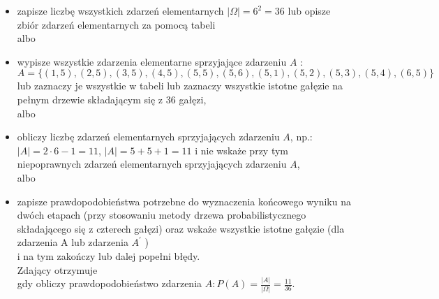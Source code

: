 \documentclass[10pt]{article}
\begin{document}
\begin{itemize}
  \item zapisze liczbę wszystkich zdarzeń elementarnych $|\Omega|=6^{2}=36$ lub opisze zbiór zdarzeń elementarnych za pomocą tabeli\\
albo
  \item wypisze wszystkie zdarzenia elementarne sprzyjające zdarzeniu $A$ :\\
$A=\{(1,5),(2,5),(3,5),(4,5),(5,5),(5,6),(5,1),(5,2),(5,3),(5,4),(6,5)\}$\\
lub zaznaczy je wszystkie w tabeli lub zaznaczy wszystkie istotne gałęzie na pełnym drzewie składającym się z 36 gałęzi,\\
albo
  \item obliczy liczbę zdarzeń elementarnych sprzyjających zdarzeniu $A$, np.: $|A|=2 \cdot 6-1=11$, $|A|=5+5+1=11$ i nie wskaże przy tym niepoprawnych zdarzeń elementarnych sprzyjających zdarzeniu $A$,\\
albo
  \item zapisze prawdopodobieństwa potrzebne do wyznaczenia końcowego wyniku na dwóch etapach (przy stosowaniu metody drzewa probabilistycznego składającego się z czterech gałęzi) oraz wskaże wszystkie istotne gałęzie (dla zdarzenia A lub zdarzenia $A^{\prime}$ )\\
i na tym zakończy lub dalej popełni błędy.\\
Zdający otrzymuje\\
gdy obliczy prawdopodobieństwo zdarzenia $A: P(A)=\frac{|A|}{|\Omega|}=\frac{11}{36}$.
\end{itemize}
\end{document}
